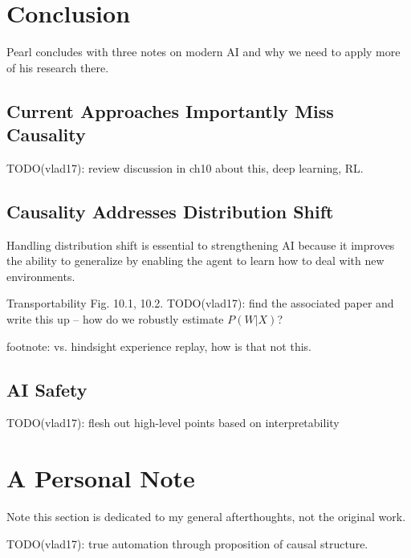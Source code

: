 \documentclass{article}
\begin{document}
\section{Conclusion}

Pearl concludes with three notes on modern AI and why we need to apply more of his research there.

\subsection{Current Approaches Importantly Miss Causality}

TODO(vlad17): review discussion in ch10 about this, deep learning, RL.

\subsection{Causality Addresses Distribution Shift}

Handling distribution shift is essential to strengthening AI because it improves the ability to generalize by enabling the agent to learn how to deal with new environments.

Transportability Fig. 10.1, 10.2. TODO(vlad17): find the associated paper and write this up -- how do we robustly estimate $P(W|X)$?


footnote: vs. hindsight experience replay, how is that not this.

\subsection{AI Safety}

TODO(vlad17): flesh out high-level points based on interpretability

\section*{A Personal Note}

Note this section is dedicated to my general afterthoughts, not the original work.

TODO(vlad17): true automation through proposition of causal structure.


{}

\end{document}
